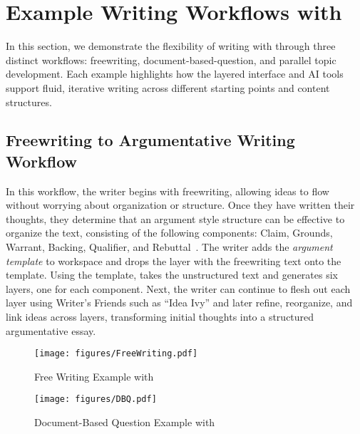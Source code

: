 \section{Example Writing Workflows with \system}

In this section, we demonstrate the flexibility of writing with \system through three distinct workflows: freewriting, document-based-question, and parallel topic development. Each example highlights how the layered interface and AI tools support fluid, iterative writing across different starting points and content structures.


\subsection{Freewriting to Argumentative Writing Workflow}
In this workflow, the writer begins with freewriting, allowing ideas to flow without worrying about organization or structure. Once they have written their thoughts, they determine that an argument style structure can be effective to organize the text, consisting of the following components: Claim, Grounds, Warrant, Backing, Qualifier, and Rebuttal~\cite{toulmin2003uses,marshall1989representing}. The writer adds the \textit{argument template}  to \systems workspace and drops the layer with the freewriting text onto the template. Using the template, \system takes the unstructured text and generates six layers, one for each component. Next, the writer can continue to flesh out each layer using Writer's Friends such as ``Idea Ivy'' and later refine, reorganize, and link ideas across layers, transforming initial thoughts into a structured argumentative essay.

\begin{figure*}[t]
    \centering
    \texttt{[image: figures/FreeWriting.pdf]}
    \caption{Free Writing Example with \system {}}
    \label{fig:freewriting}
\end{figure*}

\begin{figure*}[t]
    \centering
    \texttt{[image: figures/DBQ.pdf]}
    \caption{Document-Based Question Example with \system {}}
    \label{fig:freewriting}
\end{figure*}



